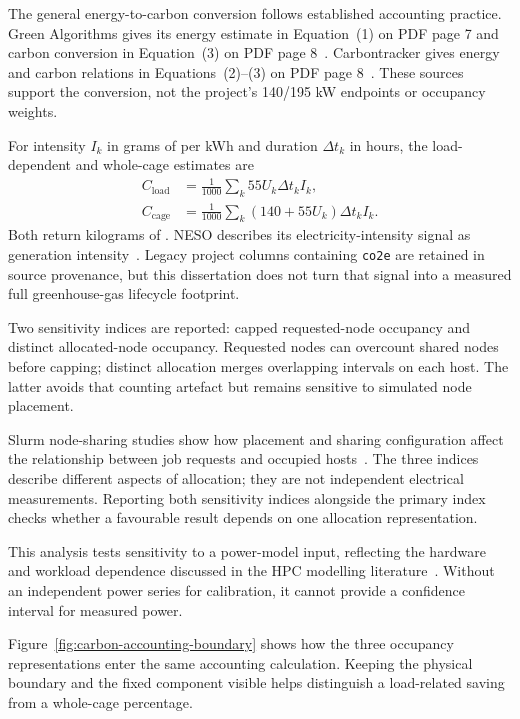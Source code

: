 The general energy-to-carbon conversion follows established accounting practice. Green Algorithms gives its energy estimate in Equation~(1) on PDF page 7 and carbon conversion in Equation~(3) on PDF page 8~\cite{lannelongue2021green}. Carbontracker gives energy and carbon relations in Equations~(2)--(3) on PDF page 8~\cite{anthony2020carbontracker}. These sources support the conversion, not the project's 140/195 kW endpoints or occupancy weights.

For intensity $I_k$ in grams of \co{} per kWh and duration $\Delta t_k$ in hours, the load-dependent and whole-cage estimates are
\begin{align}
C_{\mathrm{load}}&=\frac{1}{1000}\sum_k 55U_k\Delta t_k I_k,\label{eq:carbonload}\\
C_{\mathrm{cage}}&=\frac{1}{1000}\sum_k (140+55U_k)\Delta t_k I_k.\label{eq:carboncage}
\end{align}
Both return kilograms of \co. NESO describes its electricity-intensity signal as generation \co{} intensity~\cite{nesoCarbonIntensity,nesoAPI}. Legacy project columns containing \texttt{co2e} are retained in source provenance, but this dissertation does not turn that signal into a measured full greenhouse-gas lifecycle footprint.

\FloatBarrier

Two sensitivity indices are reported: capped requested-node occupancy and distinct allocated-node occupancy. Requested nodes can overcount shared nodes before capping; distinct allocation merges overlapping intervals on each host. The latter avoids that counting artefact but remains sensitive to simulated node placement.

Slurm node-sharing studies show how placement and sharing configuration affect the relationship between job requests and occupied hosts~\cite{simakov2018sharing}. The three indices describe different aspects of allocation; they are not independent electrical measurements. Reporting both sensitivity indices alongside the primary index checks whether a favourable result depends on one allocation representation.

This analysis tests sensitivity to a power-model input, reflecting the hardware and workload dependence discussed in the HPC modelling literature~\cite{obrien2017survey}. Without an independent power series for calibration, it cannot provide a confidence interval for measured power.

Figure~\ref{fig:carbon-accounting-boundary} shows how the three occupancy representations enter the same accounting calculation. Keeping the physical boundary and the fixed component visible helps distinguish a load-related saving from a whole-cage percentage.

\FloatBarrier

